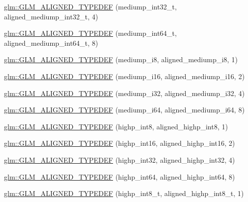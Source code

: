 \begin{DoxyCompactItemize}
\item 
\hyperlink{group__gtx__type__aligned_ga1284488189daf897cf095c5eefad9744}{glm\-::\-G\-L\-M\-\_\-\-A\-L\-I\-G\-N\-E\-D\-\_\-\-T\-Y\-P\-E\-D\-E\-F} (mediump\-\_\-int32\-\_\-t, aligned\-\_\-mediump\-\_\-int32\-\_\-t, 4)
\item 
\hyperlink{group__gtx__type__aligned_ga73fdc86a539808af58808b7c60a1c4d8}{glm\-::\-G\-L\-M\-\_\-\-A\-L\-I\-G\-N\-E\-D\-\_\-\-T\-Y\-P\-E\-D\-E\-F} (mediump\-\_\-int64\-\_\-t, aligned\-\_\-mediump\-\_\-int64\-\_\-t, 8)
\item 
\hyperlink{group__gtx__type__aligned_gafafeea923e1983262c972e2b83922d3b}{glm\-::\-G\-L\-M\-\_\-\-A\-L\-I\-G\-N\-E\-D\-\_\-\-T\-Y\-P\-E\-D\-E\-F} (mediump\-\_\-i8, aligned\-\_\-mediump\-\_\-i8, 1)
\item 
\hyperlink{group__gtx__type__aligned_ga4b35ca5fe8f55c9d2fe54fdb8d8896f4}{glm\-::\-G\-L\-M\-\_\-\-A\-L\-I\-G\-N\-E\-D\-\_\-\-T\-Y\-P\-E\-D\-E\-F} (mediump\-\_\-i16, aligned\-\_\-mediump\-\_\-i16, 2)
\item 
\hyperlink{group__gtx__type__aligned_ga63b882e29170d428463d99c3d630acc6}{glm\-::\-G\-L\-M\-\_\-\-A\-L\-I\-G\-N\-E\-D\-\_\-\-T\-Y\-P\-E\-D\-E\-F} (mediump\-\_\-i32, aligned\-\_\-mediump\-\_\-i32, 4)
\item 
\hyperlink{group__gtx__type__aligned_ga8b20507bb048c1edea2d441cc953e6f0}{glm\-::\-G\-L\-M\-\_\-\-A\-L\-I\-G\-N\-E\-D\-\_\-\-T\-Y\-P\-E\-D\-E\-F} (mediump\-\_\-i64, aligned\-\_\-mediump\-\_\-i64, 8)
\item 
\hyperlink{group__gtx__type__aligned_ga56c5ca60813027b603c7b61425a0479d}{glm\-::\-G\-L\-M\-\_\-\-A\-L\-I\-G\-N\-E\-D\-\_\-\-T\-Y\-P\-E\-D\-E\-F} (highp\-\_\-int8, aligned\-\_\-highp\-\_\-int8, 1)
\item 
\hyperlink{group__gtx__type__aligned_ga7a751b3aff24c0259f4a7357c2969089}{glm\-::\-G\-L\-M\-\_\-\-A\-L\-I\-G\-N\-E\-D\-\_\-\-T\-Y\-P\-E\-D\-E\-F} (highp\-\_\-int16, aligned\-\_\-highp\-\_\-int16, 2)
\item 
\hyperlink{group__gtx__type__aligned_ga70cd2144351c556469ee6119e59971fc}{glm\-::\-G\-L\-M\-\_\-\-A\-L\-I\-G\-N\-E\-D\-\_\-\-T\-Y\-P\-E\-D\-E\-F} (highp\-\_\-int32, aligned\-\_\-highp\-\_\-int32, 4)
\item 
\hyperlink{group__gtx__type__aligned_ga46bbf08dc004d8c433041e0b5018a5d3}{glm\-::\-G\-L\-M\-\_\-\-A\-L\-I\-G\-N\-E\-D\-\_\-\-T\-Y\-P\-E\-D\-E\-F} (highp\-\_\-int64, aligned\-\_\-highp\-\_\-int64, 8)
\item 
\hyperlink{group__gtx__type__aligned_gab3e10c77a20d1abad2de1c561c7a5c18}{glm\-::\-G\-L\-M\-\_\-\-A\-L\-I\-G\-N\-E\-D\-\_\-\-T\-Y\-P\-E\-D\-E\-F} (highp\-\_\-int8\-\_\-t, aligned\-\_\-highp\-\_\-int8\-\_\-t, 1)

\end{DoxyCompactItemize}
